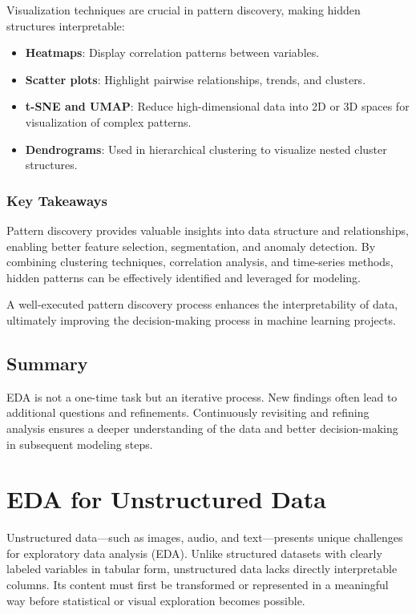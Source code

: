 \documentclass[12pt,openany]{book}
\begin{document}
Visualization techniques are crucial in pattern discovery, making hidden structures interpretable:
\begin{itemize}
    \item \textbf{Heatmaps}: Display correlation patterns between variables.
    \item \textbf{Scatter plots}: Highlight pairwise relationships, trends, and clusters.
    \item \textbf{t-SNE and UMAP}: Reduce high-dimensional data into 2D or 3D spaces for visualization of complex patterns.
    \item \textbf{Dendrograms}: Used in hierarchical clustering to visualize nested cluster structures.
\end{itemize}

\subsection{Key Takeaways}

Pattern discovery provides valuable insights into data structure and relationships, enabling better feature selection, segmentation, and anomaly detection. By combining clustering techniques, correlation analysis, and time-series methods, hidden patterns can be effectively identified and leveraged for modeling.
\newline

A well-executed pattern discovery process enhances the interpretability of data, ultimately improving the decision-making process in machine learning projects.


\section{Summary}
EDA is not a one-time task but an iterative process. New findings often lead to additional questions and refinements. Continuously revisiting and refining analysis ensures a deeper understanding of the data and better decision-making in subsequent modeling steps.



\chapter{EDA for Unstructured Data}

Unstructured data—such as images, audio, and text—presents unique 
challenges for exploratory data analysis (EDA). Unlike structured datasets 
with clearly labeled variables in tabular form, unstructured data lacks 
directly interpretable columns. Its content must first be transformed 
or represented in a meaningful way before statistical or visual 
exploration becomes possible. \newline
\end{document}
